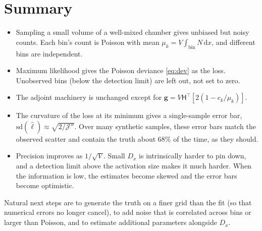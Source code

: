 \documentclass[11pt]{article}
\newcommand{\J}{\mathcal{J}}
\newcommand{\Hm}{\mathsf{H}}
\newcommand{\dd}{\mathrm{d}}
\begin{document}
\section{Summary}
\begin{itemize}
\item Sampling a small volume of a well-mixed chamber gives unbiased but noisy counts. Each bin's count is Poisson with mean $\mu_k = V\int_{\text{bin}}N\,\dd x$, and different bins are independent.
\item Maximum likelihood gives the Poisson deviance \eqref{eq:dev} as the loss. Unobserved bins (below the detection limit) are left out, not set to zero.
\item The adjoint machinery is unchanged except for $\mathbf{g} = V\Hm^\top[2(1 - c_k/\mu_k)]$.
\item The curvature of the loss at its minimum gives a single-sample error bar, $\mathrm{sd}(\hat\ell)\approx\sqrt{2/\J''}$. Over many synthetic samples, these error bars match the observed scatter and contain the truth about 68\% of the time, as they should.
\item Precision improves as $1/\sqrt{V}$. Small $D_x$ is intrinsically harder to pin down, and a detection limit above the activation size makes it much harder. When the information is low, the estimates become skewed and the error bars become optimistic.
\end{itemize}
Natural next steps are to generate the truth on a finer grid than the fit (so that numerical errors no longer cancel), to add noise that is correlated across bins or larger than Poisson, and to estimate additional parameters alongside $D_x$.

\appendix
\end{document}
